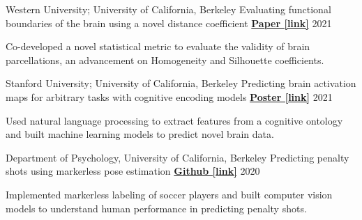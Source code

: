 \begin{cventries}
  \cventry
  	{Western University; University of California, Berkeley}
    {Evaluating functional boundaries of the brain using a novel distance coefficient} %
    {\href{https://www.biorxiv.org/content/10.1101/2021.05.11.443151v1.full.pdf}{\textbf{Paper [link]}}}
    {2021} %
    {
      \begin{cvitems} %
        \item {Co-developed a novel statistical metric to evaluate the validity of brain parcellations, an advancement on Homogeneity and Silhouette coefficients.} 	     		
      \end{cvitems}
    }
    
  \cventry
    {Stanford University; University of California, Berkeley}
    {Predicting brain activation maps for arbitrary tasks with cognitive encoding models} %
    {\href{https://drive.google.com/file/d/1dRNSsRzGSSF9QJLJv_jK1R7BmmWfOsMt/view}{\textbf{Poster [link]}}}
    {2021} %
    {
      \begin{cvitems} %
      	\item {Used natural language processing to extract features from a cognitive ontology and built machine learning models to predict novel brain data.}
      \end{cvitems}
    }   
    
  \cventry
   	{Department of Psychology, University of California, Berkeley}
    {Predicting penalty shots using markerless pose estimation} %
    {\href{https://github.com/maedbhk/action_prediction}{\textbf{Github [link]}}}
    {2020} %
    {
      \begin{cvitems} %
      	\item {Implemented markerless labeling of soccer players and built computer vision models to understand human performance in predicting penalty shots.}
      \end{cvitems}
    }   
    

\end{cventries}
